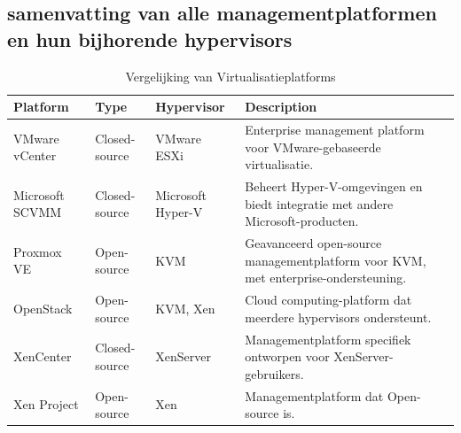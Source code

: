 \subsection{samenvatting van alle managementplatformen en hun bijhorende hypervisors}
    \begin{table}[h!]
        \centering
        \begin{tabular}{|l|l|l|l|}
        \hline
        \textbf{Platform}      & \textbf{Type}      & \textbf{Hypervisor} & \textbf{Description} \\ \hline
        VMware vCenter         & Closed-source      & VMware ESXi         & Enterprise management platform voor VMware-gebaseerde virtualisatie. \\ \hline
        Microsoft SCVMM        & Closed-source      & Microsoft Hyper-V   & Beheert Hyper-V-omgevingen en biedt integratie met andere Microsoft-producten. \\ \hline
        Proxmox VE             & Open-source        & KVM                 & Geavanceerd open-source managementplatform voor KVM, met enterprise-ondersteuning. \\ \hline
        OpenStack              & Open-source        & KVM, Xen            & Cloud computing-platform dat meerdere hypervisors ondersteunt. \\ \hline
        XenCenter              & Closed-source      & XenServer           & Managementplatform specifiek ontworpen voor XenServer-gebruikers. \\ \hline
        Xen Project            & Open-source        & Xen                 & Managementplatform dat Open-source is. \\ \hline
        \end{tabular}
        \caption{Vergelijking van Virtualisatieplatforms}
        \end{table}
        

